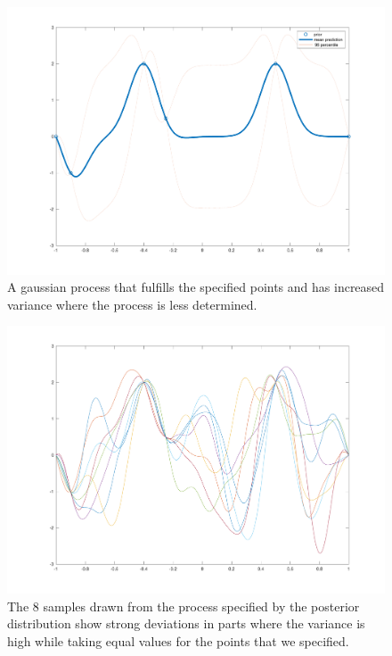 \documentclass{article}
\begin{document}
\begin{figure}
\includegraphics[width=.9\linewidth]{fig/mean.pdf}
\caption{A gaussian process that fulfills the specified points and has increased variance where the process is less determined.}
\label{fig:mean}
\end{figure}

\begin{figure}
\centering
\includegraphics[width=.9\linewidth]{fig/8rnd.pdf}
\caption{The 8 samples drawn from the process specified by the posterior distribution show strong deviations in parts where the variance is high while taking equal values for the points that we specified.}
\label{fig:8rnd}
\end{figure}
\end{document}
